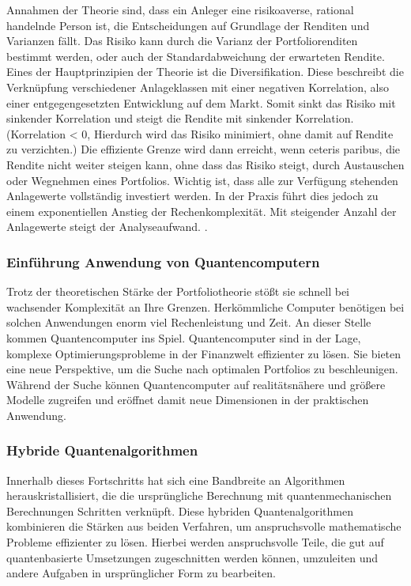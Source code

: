 Annahmen der Theorie sind, dass ein Anleger eine risikoaverse, rational handelnde Person ist, die Entscheidungen auf Grundlage der Renditen und Varianzen fällt. Das Risiko kann durch die Varianz der Portfoliorenditen bestimmt werden, oder auch der Standardabweichung der erwarteten Rendite. 
Eines der Hauptprinzipien der Theorie ist die Diversifikation. Diese beschreibt die Verknüpfung verschiedener Anlageklassen mit einer negativen Korrelation, also einer entgegengesetzten Entwicklung auf dem Markt. Somit sinkt das Risiko mit sinkender Korrelation und steigt die Rendite mit sinkender Korrelation. (Korrelation < 0, Hierdurch wird das Risiko minimiert, ohne damit auf Rendite zu verzichten.)
Die effiziente Grenze wird dann erreicht, wenn ceteris paribus, die Rendite nicht weiter steigen kann, ohne dass das Risiko steigt, durch Austauschen oder Wegnehmen eines Portfolios. 
Wichtig ist, dass alle zur Verfügung stehenden Anlagewerte vollständig investiert werden. In der Praxis führt dies jedoch zu einem exponentiellen Anstieg der Rechenkomplexität. Mit steigender Anzahl der Anlagewerte steigt der Analyseaufwand. 
\cite{sakuler2025,markowitz1959}.

\subsubsection*{Einführung Anwendung von Quantencomputern}

Trotz der theoretischen Stärke der Portfoliotheorie stößt sie schnell bei wachsender Komplexität an Ihre Grenzen. Herkömmliche Computer benötigen bei solchen Anwendungen enorm viel Rechenleistung und Zeit. 
An dieser Stelle kommen Quantencomputer ins Spiel. Quantencomputer sind in der Lage, komplexe Optimierungsprobleme in der Finanzwelt effizienter zu lösen. Sie bieten eine neue Perspektive, um die Suche nach optimalen Portfolios zu beschleunigen. Während der Suche können Quantencomputer auf realitätsnähere und größere Modelle zugreifen und eröffnet damit neue Dimensionen in der praktischen Anwendung. 

\subsubsection*{Hybride Quantenalgorithmen}

Innerhalb dieses Fortschritts hat sich eine Bandbreite an Algorithmen herauskristallisiert, die die ursprüngliche Berechnung mit quantenmechanischen Berechnungen Schritten verknüpft. Diese hybriden Quantenalgorithmen kombinieren die Stärken aus beiden Verfahren, um anspruchsvolle mathematische Probleme effizienter zu lösen. Hierbei werden anspruchsvolle Teile, die gut auf quantenbasierte Umsetzungen zugeschnitten werden können, umzuleiten und andere Aufgaben in ursprünglicher Form zu bearbeiten. 

